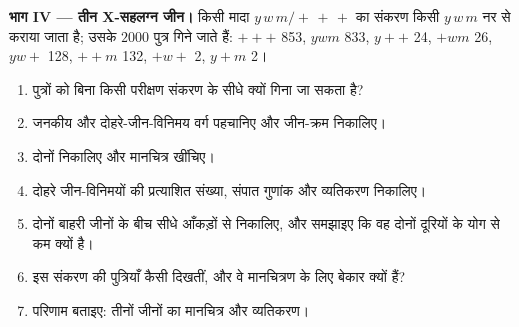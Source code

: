 \begin{problem}
\medskip
\noindent\textbf{भाग IV --- तीन X-सहलग्न जीन।}
किसी मादा $y\,w\,m/+\,+\,+$ का संकरण किसी $y\,w\,m$ नर से कराया जाता है; उसके $2000$
पुत्र गिने जाते हैं: $+++$ 853, $ywm$ 833, $y++$ 24, $+wm$ 26, $yw+$ 128,
$++m$ 132, $+w+$ 2, $y+m$ 2।
\begin{enumerate}[resume]
  \item पुत्रों को बिना किसी परीक्षण संकरण के सीधे क्यों गिना जा सकता
        है?
  \item जनकीय और दोहरे-जीन-विनिमय वर्ग पहचानिए और जीन-क्रम निकालिए।
  \item दोनों  निकालिए और मानचित्र खींचिए।
  \item दोहरे जीन-विनिमयों की प्रत्याशित संख्या, संपात गुणांक और
        व्यतिकरण निकालिए।
  \item दोनों बाहरी जीनों के बीच  सीधे
        आँकड़ों से निकालिए, और समझाइए कि वह दोनों दूरियों के योग से कम
        क्यों है।
  \item इस संकरण की पुत्रियाँ कैसी दिखतीं, और वे मानचित्रण के लिए
        बेकार क्यों हैं?
  \item परिणाम बताइए: तीनों जीनों का मानचित्र और व्यतिकरण।
\end{enumerate}
\end{problem}
